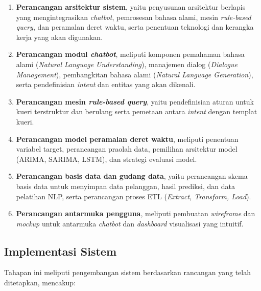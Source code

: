 \begin{enumerate}[label=\alph*.]
  \item \textbf{Perancangan arsitektur sistem}, yaitu penyusunan arsitektur berlapis yang mengintegrasikan \textit{chatbot}, pemrosesan bahasa alami, mesin \textit{rule-based query}, dan peramalan deret waktu, serta penentuan teknologi dan kerangka kerja yang akan digunakan.
  
  \item \textbf{Perancangan modul \textit{chatbot}}, meliputi komponen pemahaman bahasa alami (\textit{Natural Language Understanding}), manajemen dialog (\textit{Dialogue Management}), pembangkitan bahasa alami (\textit{Natural Language Generation}), serta pendefinisian \textit{intent} dan entitas yang akan dikenali.
  
  \item \textbf{Perancangan mesin \textit{rule-based query}}, yaitu pendefinisian aturan untuk kueri terstruktur dan berulang serta pemetaan antara \textit{intent} dengan templat kueri.
  
  \item \textbf{Perancangan model peramalan deret waktu}, meliputi penentuan variabel target, perancangan praolah data, pemilihan arsitektur model (ARIMA, SARIMA, LSTM), dan strategi evaluasi model.
  
  \item \textbf{Perancangan basis data dan gudang data}, yaitu perancangan skema basis data untuk menyimpan data pelanggan, hasil prediksi, dan data pelatihan NLP, serta perancangan proses ETL (\textit{Extract, Transform, Load}).
  
  \item \textbf{Perancangan antarmuka pengguna}, meliputi pembuatan \textit{wireframe} dan \textit{mockup} untuk antarmuka \textit{chatbot} dan \textit{dashboard} visualisasi yang intuitif.
\end{enumerate}

\subsection{Implementasi Sistem}

Tahapan ini meliputi pengembangan sistem berdasarkan rancangan yang telah ditetapkan, mencakup:

